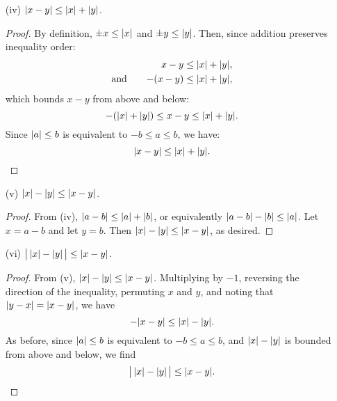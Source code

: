 \documentclass[11pt]{article}
\begin{document}
\begin{enumerate}
    \item[(iv)] $\lvert x - y\rvert \leq \lvert x\rvert + \lvert y\rvert$.
          \begin{proof}
              By definition, $\pm x \leq \lvert x\rvert$ and $\pm y \leq \lvert y\rvert$.  Then, since addition
              preserves inequality order:
              \[
                  \begin{aligned}
                                       &  & x - y             & \leq \lvert x\rvert + \lvert y\rvert, \\
                      \text{and} \quad &  & \mathord{-}(x -y) & \leq \lvert x\rvert + \lvert y\rvert,
                  \end{aligned}
              \]
              which bounds $x - y$ from above and below:
              \[
                  -(\lvert x\rvert + \lvert y\rvert) \leq x - y \leq \lvert x\rvert + \lvert y\rvert.
              \]
              Since $\lvert a\rvert \leq b$ is equivalent to $-b \leq a \leq b$, we have:
              \[
                  \lvert x - y\rvert \leq \lvert x\rvert + \lvert y\rvert.
              \]
          \end{proof}

    \item[(v)] $\lvert x\rvert - \lvert y\rvert \leq \lvert x - y\rvert$.
          \begin{proof}
              From (iv), $\lvert a - b\rvert \leq \lvert a\rvert + \lvert b\rvert$, or equivalently $\lvert a - b\rvert -
                  \lvert b\rvert \leq \lvert a\rvert$.  Let $x = a - b$ and let $y = b$.  Then $\lvert x\rvert - \lvert y\rvert \leq
                  \lvert x - y\rvert$, as desired.
          \end{proof}

    \item[(vi)] $\big\lvert\, \lvert x\rvert - \lvert y\rvert \,\big\rvert \leq \lvert x - y\rvert$.
          \begin{proof}
              From (v), $\lvert x\rvert - \lvert y\rvert \leq \lvert x - y\rvert$.  Multiplying by $-1$, reversing the
              direction of the inequality, permuting $x$ and $y$, and noting that $\lvert y - x\rvert =
                  \lvert x - y\rvert$, we have
              \[
                  -\lvert x - y\rvert \leq \lvert x\rvert - \lvert y\rvert.
              \]
              As before, since $\lvert a\rvert \leq b$ is equivalent to $-b \leq a \leq b$, and $\lvert x\rvert -
                  \lvert y\rvert$ is bounded from above and below, we find
              \[
                  \big\lvert\, \lvert x\rvert - \lvert y\rvert \,\big\rvert \leq \lvert x - y\rvert.
              \]
          \end{proof}


\end{enumerate}
\end{document}
